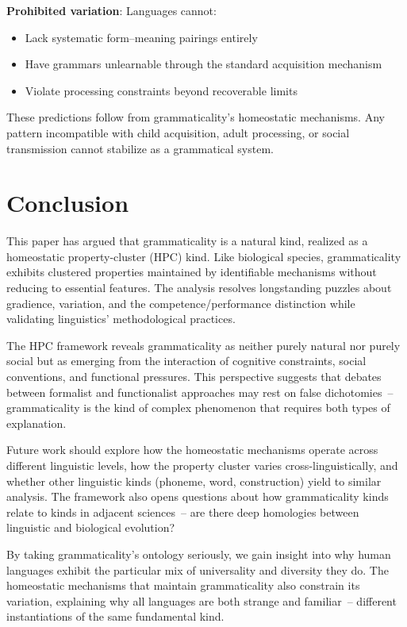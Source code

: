 \documentclass[12pt]{article}
\begin{document}
\textbf{Prohibited variation}: Languages cannot:
\begin{itemize}
    \item Lack systematic form--meaning pairings entirely
    \item Have grammars unlearnable through the standard acquisition mechanism
    \item Violate processing constraints beyond recoverable limits
\end{itemize}
These predictions follow from grammaticality's homeostatic mechanisms. Any pattern incompatible with child acquisition, adult processing, or social transmission cannot stabilize as a grammatical system.

\section{Conclusion}

This paper has argued that grammaticality is a natural kind, realized as a homeostatic property-cluster (HPC) kind. Like biological species, grammaticality exhibits clustered properties maintained by identifiable mechanisms without reducing to essential features. The analysis resolves longstanding puzzles about gradience, variation, and the competence/performance distinction while validating linguistics' methodological practices.

The HPC framework reveals grammaticality as neither purely natural nor purely social but as emerging from the interaction of cognitive constraints, social conventions, and functional pressures. This perspective suggests that debates between formalist and functionalist approaches may rest on false dichotomies~-- grammaticality is the kind of complex phenomenon that requires both types of explanation.

Future work should explore how the homeostatic mechanisms operate across different linguistic levels, how the property cluster varies cross-linguistically, and whether other linguistic kinds (phoneme, word, construction) yield to similar analysis. The framework also opens questions about how grammaticality kinds relate to kinds in adjacent sciences~-- are there deep homologies between linguistic and biological evolution?

By taking grammaticality's ontology seriously, we gain insight into why human languages exhibit the particular mix of universality and diversity they do. The homeostatic mechanisms that maintain grammaticality also constrain its variation, explaining why all languages are both strange and familiar~-- different instantiations of the same fundamental kind.

\newpage
\begin{sloppypar}
\printbibliography[title=References]
\end{sloppypar}
\end{document}
